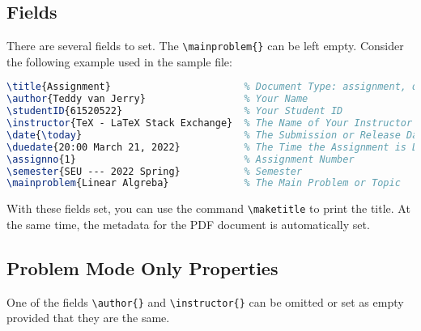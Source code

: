 \documentclass[twoside]{seu-ml-assign}
\begin{document}

    \subsection{Fields}

      There are several fields to set.
      The \verb|\mainproblem{}| can be left empty.
      Consider the following example used in the sample file:
      \begin{lstlisting}[language=tex,numbers=none]
\title{Assignment}                       % Document Type: assignment, quiz, etc.
\author{Teddy van Jerry}                 % Your Name
\studentID{61520522}                     % Your Student ID
\instructor{TeX - LaTeX Stack Exchange}  % The Name of Your Instructor
\date{\today}                            % The Submission or Release Date
\duedate{20:00 March 21, 2022}           % The Time the Assignment is Due
\assignno{1}                             % Assignment Number
\semester{SEU --- 2022 Spring}           % Semester
\mainproblem{Linear Algreba}             % The Main Problem or Topic
      \end{lstlisting}
    
      With these fields set, you can use the command \verb|\maketitle| to print the title.
      At the same time, the metadata for the PDF document is automatically set.

    \subsection{Problem Mode Only Properties}\label{subsec:prob_only_properties}
    One of the fields \verb|\author{}| and \verb|\instructor{}| can be omitted or set as empty provided that they are the same.


\end{document}
